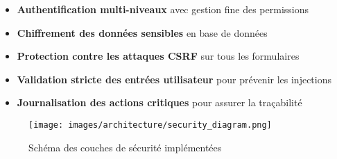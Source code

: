 \begin{itemize}
    \item \textbf{Authentification multi-niveaux} avec gestion fine des permissions
    \item \textbf{Chiffrement des données sensibles} en base de données
    \item \textbf{Protection contre les attaques CSRF} sur tous les formulaires
    \item \textbf{Validation stricte des entrées utilisateur} pour prévenir les injections
    \item \textbf{Journalisation des actions critiques} pour assurer la traçabilité
\end{itemize}

\begin{figure}[h]
    \centering
    \texttt{[image: images/architecture/security\_diagram.png]}
    \caption{Schéma des couches de sécurité implémentées}
    \label{fig:security_diagram}
\end{figure}